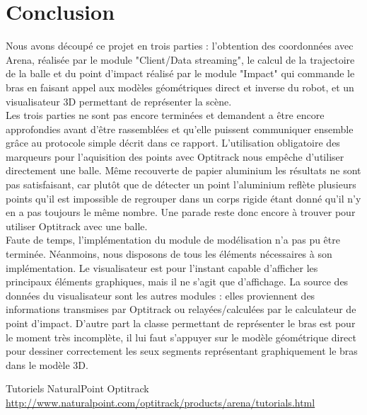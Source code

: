 \documentclass{article}[11pt]
\begin{document}
\section{Conclusion}

Nous avons découpé ce projet en trois parties : l'obtention des coordonnées avec Arena, réalisée par le module "Client/Data streaming", le calcul de la trajectoire de la balle et du point d'impact réalisé par le module "Impact" qui commande le bras en faisant appel aux modèles géométriques direct et inverse du robot, et un visualisateur 3D permettant de représenter la scène. \\

Les trois parties ne sont pas encore terminées et demandent a être encore approfondies avant d'être rassemblées et qu'elle puissent communiquer ensemble grâce au protocole simple décrit dans ce rapport. L'utilisation obligatoire des marqueurs pour l'aquisition des points avec Optitrack nous empêche d'utiliser directement une balle. Même recouverte de papier aluminium les résultats ne sont pas satisfaisant, car plutôt que de détecter un point l'aluminium reflète plusieurs points qu'il est impossible de regrouper dans un corps rigide étant donné qu'il n'y en a pas toujours le même nombre. Une parade reste donc encore à trouver pour utiliser Optitrack avec une balle. \\

Faute de temps, l'implémentation du module de modélisation n'a pas pu être terminée. Néanmoins, nous disposons de tous les éléments nécessaires à son implémentation. Le visualisateur est pour l'instant capable d'afficher les principaux éléments graphiques, mais il ne s'agit que d'affichage. La source des données du visualisateur sont les autres modules : elles proviennent des informations transmises par Optitrack ou relayées/calculées par le calculateur de point d'impact. D'autre part la classe permettant de représenter le bras est pour le moment très incomplète, il lui faut s'appuyer sur le modèle géométrique direct pour dessiner correctement les seux segments représentant graphiquement le bras dans le modèle 3D.


\begin{thebibliography}{}
  Tutoriels NaturalPoint Optitrack \\
  \url{http://www.naturalpoint.com/optitrack/products/arena/tutorials.html}

\end{thebibliography} 
\end{document}
